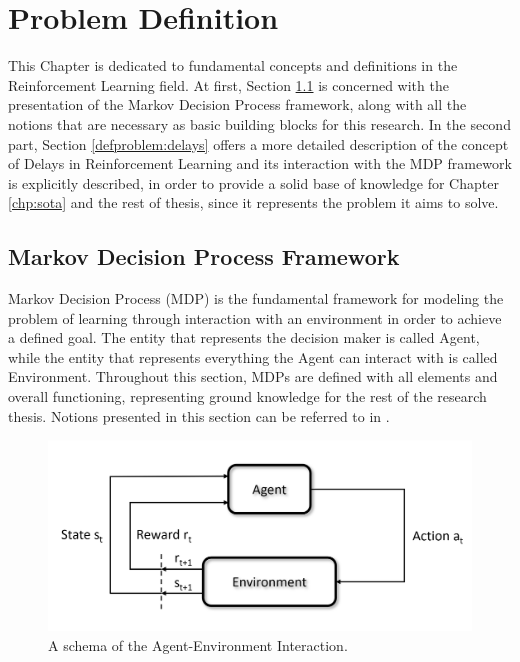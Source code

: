 \chapter{Problem Definition}
    \label{chap:defproblem}
    This Chapter is dedicated to fundamental concepts and definitions in the Reinforcement Learning field. At first, Section \ref{defproblem:mdp} is concerned with the presentation of the Markov Decision Process framework, along with all the notions that are necessary as basic building blocks for this research. In the second part, Section \ref{defproblem:delays} offers a more detailed description of the concept of Delays in Reinforcement Learning and its interaction with the MDP framework is explicitly described, in order to provide a solid base of knowledge for Chapter \ref{chp:sota} and the rest of thesis, since it represents the problem it aims to solve. 
    
    \section{Markov Decision Process Framework}
        \label{defproblem:mdp}
        Markov Decision Process (MDP) is the fundamental framework for modeling the problem of learning through interaction with an environment in order to achieve a defined goal. The entity that represents the decision maker is called Agent, while the entity that represents everything the Agent can interact with is called Environment. Throughout this section, MDPs are defined with all elements and overall functioning, representing ground knowledge for the rest of the research thesis. Notions presented in this section can be referred to in .
        
        \begin{figure}[t]
            \centering
            \includegraphics[width=14cm, keepaspectratio]{images/mdp/int_schema.png}
            \caption{A schema of the Agent-Environment Interaction.}
            \label{fig:mdp}
        \end{figure}
        
